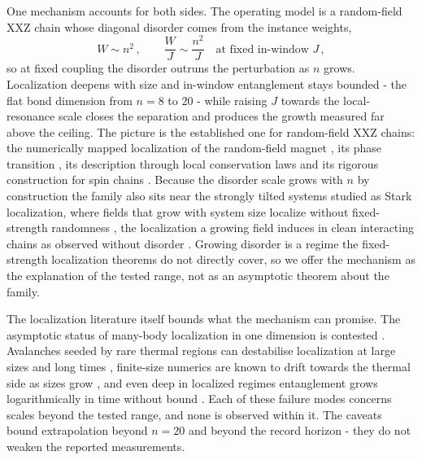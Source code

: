 One mechanism accounts for both sides. The operating model is a random-field XXZ chain whose diagonal disorder comes from the instance weights,
\begin{equation*}
W \sim n^{2}\,, \qquad \frac{W}{J} \sim \frac{n^{2}}{J} \quad \text{at fixed in-window } J\,,
\end{equation*}
so at fixed coupling the disorder outruns the perturbation as $n$ grows. Localization deepens with size and in-window entanglement stays bounded - the flat bond dimension from $n = 8$ to $20$ - while raising $J$ towards the local-resonance scale closes the separation and produces the growth measured far above the ceiling. The picture is the established one for random-field XXZ chains: the numerically mapped localization of the random-field magnet \cite{znidaric2008mbl}, its phase transition \cite{pal2010mbl}, its description through local conservation laws \cite{serbyn2013liom} and its rigorous construction for spin chains \cite{imbrie2016mbl}. Because the disorder scale grows with $n$ by construction the family also sits near the strongly tilted systems studied as Stark localization, where fields that grow with system size localize without fixed-strength randomness \cite{schulz2019stark}, the localization a growing field induces in clean interacting chains \cite{vannieuwenburg2019stark} as observed without disorder \cite{morong2021stark}. Growing disorder is a regime the fixed-strength localization theorems do not directly cover, so we offer the mechanism as the explanation of the tested range, not as an asymptotic theorem about the family.

The localization literature itself bounds what the mechanism can promise. The asymptotic status of many-body localization in one dimension is contested \cite{nandkishore2015mbl, abanin2019mbl}. Avalanches seeded by rare thermal regions can destabilise localization at large sizes and long times \cite{deroeck2017avalanche, luitz2017thermalize}, finite-size numerics are known to drift towards the thermal side as sizes grow \cite{morningstar2022avalanches}, and even deep in localized regimes entanglement grows logarithmically in time without bound \cite{bardarson2012unbounded}. Each of these failure modes concerns scales beyond the tested range, and none is observed within it. The caveats bound extrapolation beyond $n = 20$ and beyond the record horizon - they do not weaken the reported measurements.

